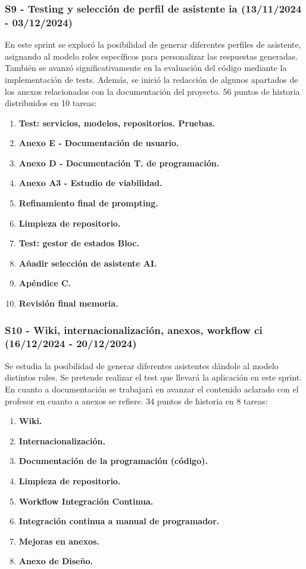 \subsubsection{S9 - Testing y selección de perfil de asistente \acrshort{ia} (13/11/2024 - 03/12/2024)}
En este sprint se exploró la posibilidad de generar diferentes perfiles de asistente, asignando al modelo roles específicos para personalizar las respuestas generadas. También se avanzó significativamente en la evaluación del código mediante la implementación de tests. Además, se inició la redacción de algunos apartados de los anexos relacionados con la documentación del proyecto. 56 puntos de historia distribuidos en 10 tareas:
\begin{enumerate}
	\item \textbf{Test: servicios, modelos, repositorios. Pruebas.}
	\item \textbf{Anexo E - Documentación de usuario.}
	\item \textbf{Anexo D - Documentación T. de programación.}
	\item \textbf{Anexo A3 - Estudio de viabilidad.}
	\item \textbf{Refinamiento final de prompting.}
	\item \textbf{Limpieza de repositorio.}
	\item \textbf{Test: gestor de estados Bloc.}
	\item \textbf{Añadir selección de asistente AI.}
	\item \textbf{Apéndice C.}
	\item \textbf{Revisión final memoria.}
\end{enumerate}

\subsubsection{S10 - Wiki, internacionalización, anexos, workflow ci (16/12/2024 - 20/12/2024)}
Se estudia la posibilidad de generar diferentes asistentes dándole al modelo distintos roles. Se pretende realizar el test que llevará la aplicación en este sprint. En cuanto a documentación se trabajará en avanzar el contenido aclarado con el profesor en cuanto a anexos se refiere. 34 puntos de historia en 8 tareas:
\begin{enumerate}
	\item \textbf{Wiki.}
	\item \textbf{Internacionalización.}
	\item \textbf{Documentación de la programación (código).}
	\item \textbf{Limpieza de repositorio.}
	\item \textbf{Workflow Integración Continua.}
	\item \textbf{Integración continua a manual de programador.}
	\item \textbf{Mejoras en anexos.}
	\item \textbf{Anexo de Diseño.}
\end{enumerate}

